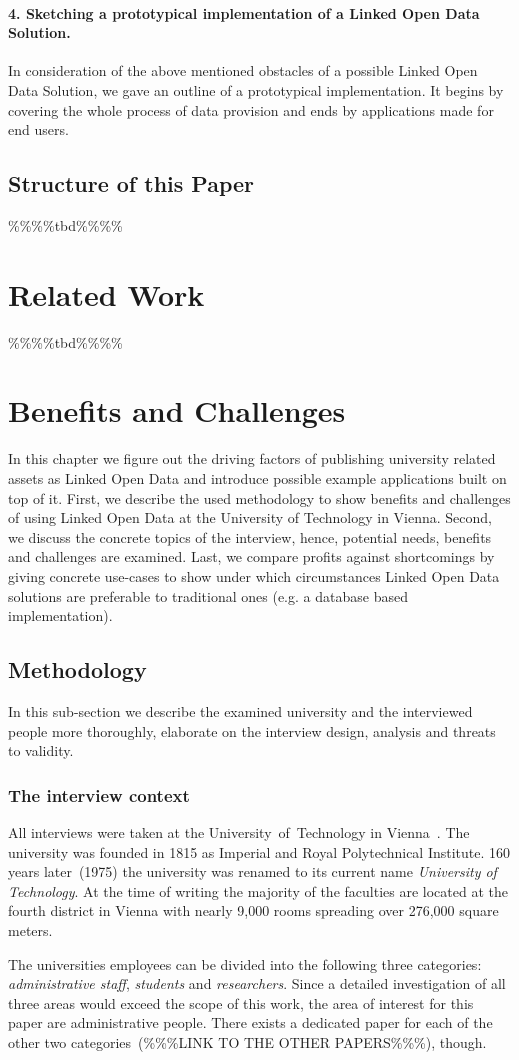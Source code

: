 \documentclass{article}
\begin{document}
\paragraph{4. Sketching a prototypical implementation of a Linked Open Data Solution.}
In consideration of the above mentioned obstacles of a possible Linked Open Data Solution, we gave an outline of a prototypical implementation. It begins by covering the whole process of data provision and ends by applications made for end users. 
\subsection{Structure of this Paper}
\%\%\%\%tbd\%\%\%\%

\section{Related Work}
\%\%\%\%tbd\%\%\%\%
\section{Benefits and Challenges}
In this chapter we figure out the driving factors of publishing university related assets as Linked Open Data and introduce possible example applications built on top of it. First, we describe the used methodology to show benefits and challenges of using Linked Open Data at the University of Technology in Vienna. Second, we discuss the concrete topics of the interview, hence, potential needs, benefits and challenges are examined. Last, we compare profits against shortcomings by giving concrete use-cases to show under which circumstances Linked Open Data solutions are preferable to traditional ones (e.g. a database based implementation). 
\subsection{Methodology}
In this sub-section we describe the examined university and the interviewed people more thoroughly, elaborate on the interview design, analysis and threats to validity.
\subsubsection{The interview context}
All interviews were taken at the University~of~Technology in Vienna~\cite{url:university-of-technology-vienna}. The university was founded in 1815 as Imperial and Royal Polytechnical Institute. 160 years later~(1975) the university was renamed to its current name \textit{University of Technology}. At the time of writing the majority of the faculties are located at the fourth district in Vienna with nearly 9,000 rooms spreading over 276,000 square meters.

The universities employees can be divided into the following three categories: \textit{administrative staff}, \textit{students} and \textit{researchers}. Since a detailed investigation of all three areas would exceed the scope of this work, the area of interest for this paper are administrative people. There exists a dedicated paper for each of the other two categories~(\%\%\%LINK TO THE OTHER PAPERS\%\%\%), though. 

\newpage


\end{document}

